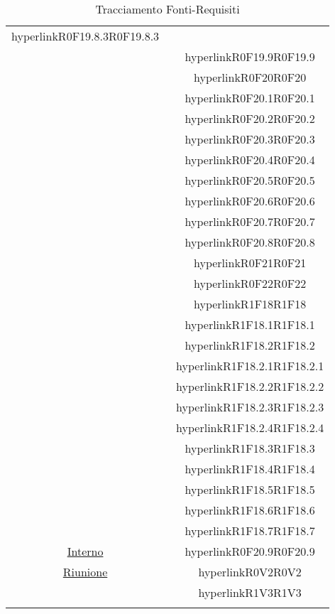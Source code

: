 \documentclass[../AnalisiDeiRequisiti.tex]{subfiles}
\begin{document}
\begin{longtable}{|c|c|}
	hyperlink{R0F19.8.3}{R0F19.8.3}\\& \
	hyperlink{R0F19.9}{R0F19.9}\\& \
	hyperlink{R0F20}{R0F20}\\& \
	hyperlink{R0F20.1}{R0F20.1}\\& \
	hyperlink{R0F20.2}{R0F20.2}\\& \
	hyperlink{R0F20.3}{R0F20.3}\\& \
	hyperlink{R0F20.4}{R0F20.4}\\& \
	hyperlink{R0F20.5}{R0F20.5}\\& \
	hyperlink{R0F20.6}{R0F20.6}\\& \
	hyperlink{R0F20.7}{R0F20.7}\\& \
	hyperlink{R0F20.8}{R0F20.8}\\& \
	hyperlink{R0F21}{R0F21}\\& \
	hyperlink{R0F22}{R0F22}\\& \
	hyperlink{R1F18}{R1F18}\\& \
	hyperlink{R1F18.1}{R1F18.1}\\& \
	hyperlink{R1F18.2}{R1F18.2}\\& \
	hyperlink{R1F18.2.1}{R1F18.2.1}\\& \
	hyperlink{R1F18.2.2}{R1F18.2.2}\\& \
	hyperlink{R1F18.2.3}{R1F18.2.3}\\& \
	hyperlink{R1F18.2.4}{R1F18.2.4}\\& \
	hyperlink{R1F18.3}{R1F18.3}\\& \
	hyperlink{R1F18.4}{R1F18.4}\\& \
	hyperlink{R1F18.5}{R1F18.5}\\& \
	hyperlink{R1F18.6}{R1F18.6}\\& \
	hyperlink{R1F18.7}{R1F18.7}\\\hline
	\hyperlink{Interno}{Interno} & \
	hyperlink{R0F20.9}{R0F20.9}\\\hline
	\hyperlink{Riunione}{Riunione} & \
	hyperlink{R0V2}{R0V2}\\& \
	hyperlink{R1V3}{R1V3}\\\hline
	\caption[Tracciamento Fonti-Requisiti]{Tracciamento Fonti-Requisiti}
	\label{tabella:fonti-requi}
\end{longtable}
\clearpage
\end{document}
